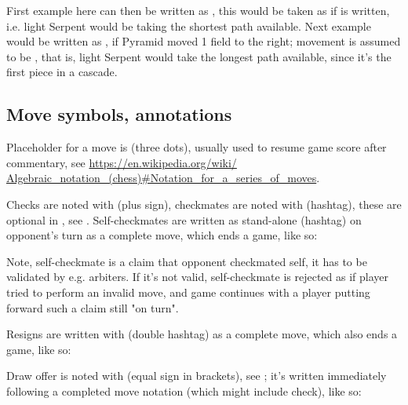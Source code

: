 First example here can then be written as , this would be taken as if
 is written, i.e. light Serpent would be taking the shortest path
available. Next example would be written as , if Pyramid moved
1 field to the right; movement is assumed to be\newline
\alg{[Sc3.d2.e3.f2.g3.f4.g5.f6.e5.d6.c5.b6.c7]}\newline
\alg{\textasciitilde{}[Ac7-d7]}, that is, light Serpent would take the longest path
available, since it's the first piece in a cascade.

\subsection*{Move symbols, annotations}
\label{sec:Appendix/Notation/Move symbols, annotations}

Placeholder for a move is  (three dots), usually used to resume game score
after commentary, see\newline
\href{https://en.wikipedia.org/wiki/Algebraic\_notation\_(chess)\#Notation\_for\_a\_series\_of\_moves}
{https://en.wikipedia.org/wiki/\newline
Algebraic\_notation\_(chess)\#Notation\_for\_a\_series\_of\_moves}.

Checks are noted with \alg{+} (plus sign), checkmates are noted with \alg{\#} (hashtag),
these are optional in , see . Self-checkmates are written
as stand-alone \alg{\#} (hashtag) on opponent's turn as a complete move, which ends
a game, like so:

\algcycpar
{}
\algcycparend

Note, self-checkmate is a claim that opponent checkmated self, it has to be validated
by e.g. arbiters. If it's not valid, self-checkmate is rejected as if player tried to
perform an invalid move, and game continues with a player putting forward such a claim
still "on turn".

Resigns are written with \alg{\#\#} (double hashtag) as a complete move, which also
ends a game, like so:

\algcycpar
{}
\algcycparend

Draw offer is noted with \alg{(=)} (equal sign in brackets), see ;
it's written immediately following a completed move notation (which might include check),
like so:

